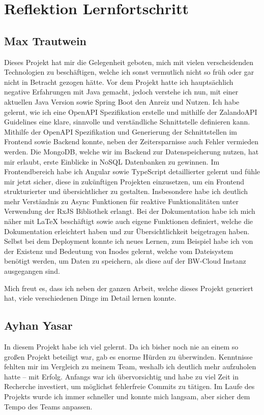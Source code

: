 \chapter{Reflektion Lernfortschritt}\label{ch:reflektion-lernfortschritt}


\section{Max Trautwein}
Dieses Projekt hat mir die Gelegenheit geboten, mich mit vielen verscheidenden Technologien zu beschäftigen,
welche ich sonst vermutlich nicht so früh oder gar nicht in Betracht gezogen hätte.
Vor dem Projekt hatte ich hauptsächlich negative Erfahrungen mit Java gemacht,
jedoch verstehe ich nun, mit einer aktuellen Java Version sowie Spring Boot den Anreiz und Nutzen.
Ich habe gelernt, wie ich eine OpenAPI Spezifikation erstelle und mithilfe der
ZalandoAPI Guidelines eine klare, sinnvolle und verständliche Schnittstelle definieren kann.
Mithilfe der OpenAPI Spezifikation und Generierung der Schnittstellen im Frontend sowie Backend
konnte, neben der Zeitersparnisse auch Fehler vermieden werden.
Die MongoDB, welche wir im Backend zur Datenspeicherung nutzen, hat mir erlaubt,
erste Einblicke in NoSQL Datenbanken zu gewinnen.
Im Frontendbereich habe ich Angular sowie \gls{TypeScript} detaillierter gelernt und fühle mir jetzt sicher,
diese in zukünftigen Projekten einzusetzen, um ein Frontend strukturierter und übersichtlicher zu gestalten.
Insbesondere habe ich deutlich mehr Verständnis zu Async Funktionen für reaktive Funktionalitäten
unter Verwendung der RxJS Bibliothek erlangt.
Bei der Dokumentation habe ich mich näher mit LaTeX beschäftigt sowie auch eigene Funktionen definiert,
welche die Dokumentation erleichtert haben und zur Übersichtlichkeit beigetragen haben.
Selbst bei dem Deployment konnte ich neues Lernen, zum Beispiel habe ich von der Existenz und Bedeutung von Inodes gelernt,
welche vom Dateisystem benötigt werden, um Daten zu speichern, als diese auf der BW-Cloud Instanz ausgegangen sind.

Mich freut es, dass ich neben der ganzen Arbeit, welche dieses Projekt generiert hat,
viele verschiedenen Dinge im Detail lernen konnte.


\section{Ayhan Yasar}

In diesem Projekt habe ich viel gelernt. Da ich bisher noch nie an einem so großen Projekt beteiligt war, gab es enorme Hürden zu überwinden. 
Kenntnisse fehlten mir im Vergleich zu meinem Team, weshalb ich deutlich mehr aufzuholen hatte – mit Erfolg. 
Anfangs war ich übervorsichtig und habe zu viel Zeit in Recherche investiert, um möglichst fehlerfreie Commits zu tätigen. 
Im Laufe des Projekts wurde ich immer schneller und konnte mich langsam, aber sicher dem Tempo des Teams anpassen.

